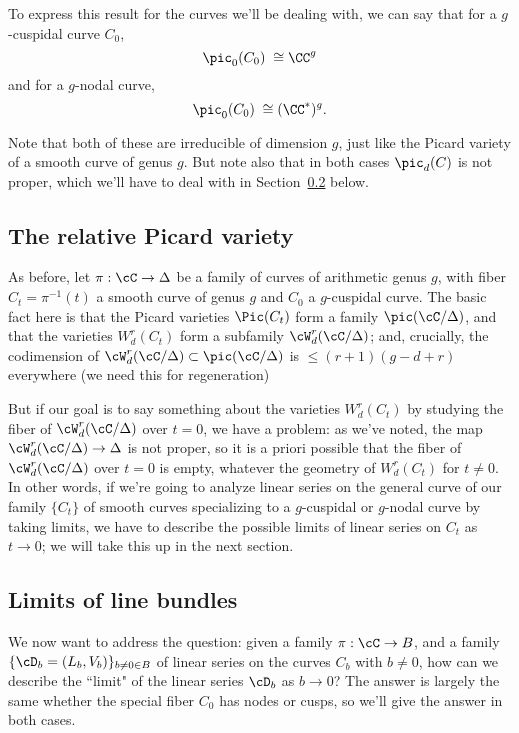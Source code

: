 To express this result for the curves we'll be dealing with, we can say that for a $g$-cuspidal curve $C_0$,
$$
\pic_0(C_0) \; \cong \CC^g
$$
and for a $g$-nodal curve, 
$$
\pic_0(C_0) \; \cong (\CC^*)^g.
$$

Note that both of these are irreducible of dimension $g$, just like the Picard variety of a smooth curve of genus $g$. But note also that in both cases $\pic_d(C)$ is not proper, which we'll have to deal with in Section~\ref{line bundle limits} below.

\subsection{The relative Picard variety}

As before, let $\pi : \cC \to \Delta$ be a family of curves of arithmetic genus $g$, with fiber $C_t = \pi^{-1}(t)$ a smooth curve of genus $g$ and $C_0$ a $g$-cuspidal curve. The basic fact here is that the Picard varieties $\Pic(C_t)$ form a family $\pic(\cC/\Delta)$, and that the varieties $W^r_d(C_t)$ form a subfamily $\cW^r_d(\cC/\Delta)$; and, crucially, the codimension of $\cW^r_d(\cC/\Delta) \subset \pic(\cC/\Delta)$ is $\leq (r+1)(g-d+r)$ everywhere (we need this for regeneration)

But if our goal is to say something about the varieties $W^r_d(C_t)$ by studying the fiber of $\cW^r_d(\cC/\Delta)$ over $t=0$, we have a problem: as we've noted, the map $\cW^r_d(\cC/\Delta) \to \Delta$ is not proper, so it is a priori possible that the fiber of $\cW^r_d(\cC/\Delta)$ over $t=0$ is empty, whatever the geometry of $W^r_d(C_t)$ for $t \neq 0$. In other words,  if we're going to analyze linear series on the general curve of our family $\{C_t\}$ of smooth curves specializing to a $g$-cuspidal or $g$-nodal curve by taking limits, we have to describe the possible limits of linear series on $C_t$ as $t\to 0$; we will take this up in the next section.



\subsection{Limits of line bundles}\label{line bundle limits}

We now want to address the question: given a family $\pi : \cC \to B$, and a family $\{ \cD_b = (L_b, V_b)\}_{b \neq 0 \in B}$ of linear series on the curves $C_b$ with $b \neq 0$, how can we describe the ``limit" of the linear series $\cD_b$ as $b \to 0$? The answer is largely the same whether the special fiber $C_0$ has nodes or cusps, so we'll give the answer in both cases. 

